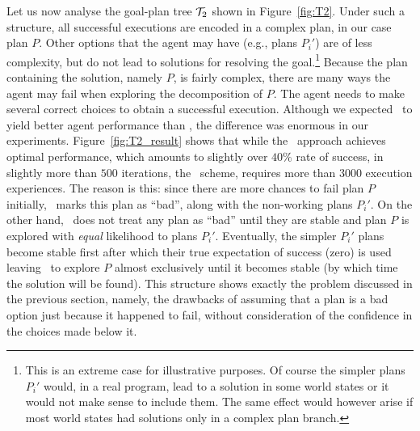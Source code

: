 Let us now analyse the goal-plan tree ${\mathcal{T}}_2$ shown in Figure~\ref{fig:T2}.
Under such a structure, all successful executions are encoded in a complex plan,
in our case plan $P$. Other options that the agent may have (e.g., plans $P_i'$)
are of less complexity, but do not lead to solutions for resolving the
goal.\footnote{This is an extreme case for illustrative purposes. Of course the
simpler plans $P_i'$ would, in a real program, lead to a solution in some world
states or it would not make sense to include them. The same effect would however
arise if most world states had solutions only in a complex plan branch.}
Because the plan containing the solution, namely $P$, is fairly complex, there
are many ways the agent may fail when exploring the decomposition of $P$. The
agent needs to make several correct choices to obtain a successful execution.
Although we expected \BUL\ to yield better agent performance than \CL, the
difference was enormous in our experiments. Figure~\ref{fig:T2_result} shows that
while the \BUL\ approach achieves optimal performance, which amounts to slightly
over $40\%$ rate of success, in slightly more than $500$ iterations, the \CL\
scheme, requires more than $3000$ execution experiences. The reason is this:
since there are more chances to fail plan $P$ initially, \CL\ marks this plan as
``bad'', along with the non-working plans $P_i'$. 
On the other hand, \BUL\ does not treat any plan as ``bad'' until they are stable and plan $P$ is explored with \emph{equal} likelihood
to plans $P_i'$. 
Eventually, the simpler $P_i'$ plans become stable first after which their true expectation of success (zero) is used leaving \BUL\ to explore $P$ almost exclusively until it becomes stable (by which time the solution will be found).
This structure shows exactly the problem discussed in the previous section,
namely, the drawbacks of assuming that a plan is a bad option just because it
happened to fail, without consideration of the confidence in the choices made
below it.


